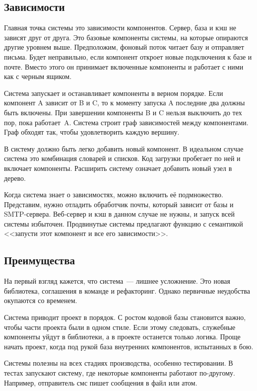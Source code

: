 \subsection{Зависимости}

Главная точка системы это зависимости компонентов. Сервер, база и кэш не зависят
друг от друга. Это базовые компоненты системы, на которые опираются другие
уровнем выше. Предположим, фоновый поток читает базу и отправляет письма. Будет
неправильно, если компонент откроет новые подключения к базе и почте. Вместо
этого он принимает включенные компоненты и работает с ними как с черным ящиком.

Система запускает и останавливает компоненты в верном порядке. Если компонент A
зависит от B и C, то к моменту запуска A последние два должны быть включены. При
завершении компоненты B и C нельзя выключить до тех пор, пока
работает~A. Система строит граф зависимостей между компонентами. Граф обходят
так, чтобы удовлетворить каждую вершину.

В систему должно быть легко добавить новый компонент. В идеальном случае система
это комбинация словарей и списков. Код загрузки пробегает по ней и включает
компоненты. Расширить систему означает добавить новый узел в дерево.

Когда система знает о зависимостях, можно включить е\"{е} подмножество. Представим,
нужно отладить обработчик почты, который зависит от базы и
SMTP-сервера. Веб-сервер и кэш в данном случае не нужны, и запуск всей системы
избыточен. Продвинутые системы предлагают функцию с семантикой <<запусти этот
компонент и все его зависимости>>.

\subsection{Преимущества}

На первый взгляд кажется, что система~--- лишнее усложнение. Это новая
библиотека, соглашения в команде и рефакторинг. Однако первичные неудобства
окупаются со временем.

Система приводит проект в порядок. С ростом кодовой базы становится важно, чтобы
части проекта были в одном стиле. Если этому следовать, служебные компоненты
уйдут в библиотеки, а в проекте останется только логика. Проще начать проект,
когда под рукой база внутренних компонентов, испытанных в бою.

Системы полезны на всех стадиях производства, особенно тестировании. В тестах
запускают систему, где некоторые компоненты работают по-другому. Например,
отправитель смс пишет сообщения в файл или атом.

